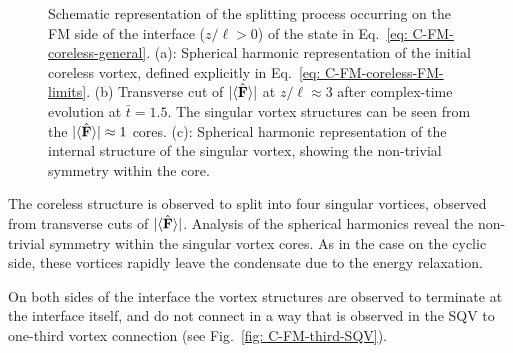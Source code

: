 \begin{figure}
    \caption[Dynamics of the coreless vortex in a cyclic to ferromagnetic
        interface]
    {\label{fig: C-FM-coreless-FM}Schematic representation of the
        splitting process occurring on the FM side of the interface
        (\(z/\ell > 0\)) of the state in Eq.~\eqref{eq: C-FM-coreless-general}.
        (a): Spherical harmonic representation of the initial coreless vortex,
        defined explicitly in Eq.~\eqref{eq: C-FM-coreless-FM-limits}.
        (b) Transverse cut of \(|\langle \hat{\vb{F}} \rangle | \) at \(z/\ell \approx 3\) after
        complex-time evolution at \(\bar{t} = 1.5\).
        The singular vortex structures can be seen from the
        \(|\langle \hat{\vb{F}} \rangle | \approx 1\) cores.
        (c): Spherical harmonic representation of the internal structure of
        the singular vortex, showing the non-trivial symmetry within the core.}
\end{figure}
The coreless structure is observed to split into four singular vortices,
observed from transverse cuts of \(|\langle \hat{\vb{F}} \rangle | \).
Analysis of the spherical harmonics reveal the non-trivial symmetry within
the singular vortex cores.
As in the case on the cyclic side, these vortices rapidly leave the condensate
due to the energy relaxation.

On both sides of the interface the vortex structures are observed to terminate
at the interface itself, and do not connect in a way that is observed in the
SQV to one-third vortex connection (see Fig.~\ref{fig: C-FM-third-SQV}).
